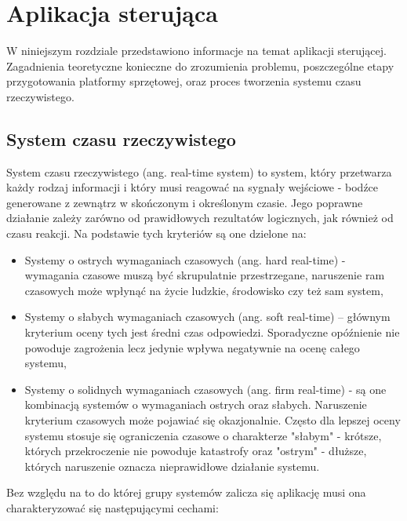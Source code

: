 \chapter{Aplikacja sterująca}
\label{cha:aplikacja_sterujaca}
W niniejszym rozdziale przedstawiono informacje na temat aplikacji sterującej. Zagadnienia teoretyczne konieczne do zrozumienia problemu, poszczególne etapy przygotowania platformy sprzętowej, oraz proces tworzenia systemu czasu rzeczywistego.




\section{System czasu rzeczywistego}
System czasu rzeczywistego (ang. real-time system) to system, który przetwarza każdy rodzaj informacji i który musi reagować na sygnały wejściowe - bodźce generowane z zewnątrz w skończonym i określonym czasie. Jego poprawne działanie zależy zarówno od prawidłowych rezultatów logicznych, jak również od czasu reakcji.
Na podstawie tych kryteriów są one dzielone na:
\begin{itemize}
	\item Systemy o ostrych wymaganiach czasowych (ang. hard real-time) - wymagania czasowe muszą być skrupulatnie przestrzegane, naruszenie ram czasowych może wpłynąć na życie ludzkie, środowisko czy też sam system,
 
	\item Systemy o słabych wymaganiach czasowych (ang. soft real-time) – głównym kryterium oceny tych jest średni czas odpowiedzi. Sporadyczne opóźnienie nie powoduje zagrożenia lecz jedynie wpływa negatywnie na ocenę całego systemu,

	\item Systemy o solidnych wymaganiach czasowych (ang. firm real-time) - są one kombinacją systemów o wymaganiach ostrych oraz słabych. Naruszenie kryterium czasowych może pojawiać się okazjonalnie. Często dla lepszej oceny systemu stosuje się ograniczenia czasowe o charakterze "słabym" - krótsze, których przekroczenie nie powoduje katastrofy oraz "ostrym" - dłuższe, których naruszenie oznacza nieprawidłowe działanie systemu. 

\end{itemize}

Bez względu na to do której grupy systemów zalicza się aplikację musi ona charakteryzować się następującymi cechami:

